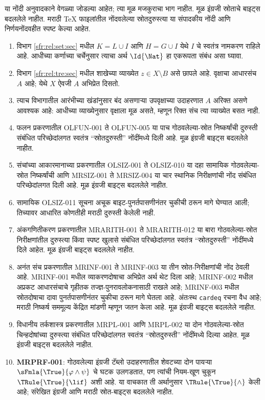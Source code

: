 या नोंदी अनुवादकाने वेगळ्या जोडल्या आहेत; त्या मूळ मजकुराचा भाग नाहीत.
मूळ इंग्रजी स्रोताचे बाइट्स बदललेले नाहीत. मराठी TeX फाइलांतील नोंदवलेल्या स्रोतदुरुस्त्या या संपादकीय नोंदी आणि निर्णयनोंदवहीत स्पष्ट केल्या आहेत.
\begin{enumerate}
\item विभाग \ref{sfr:rel:set:sec} मधील $K=L\cup I$ आणि $H=G\cup I$ येथे
$I$ चे स्वतंत्र नामकरण राहिले आहे. आधीच्या कर्णाच्या चर्चेनुसार त्याचा अर्थ
$\Id{\Nat}$ हा एकरूपता संबंध असा घ्यावा.
\item विभाग \ref{sfr:rel:tre:sec} मधील शाखेच्या व्याख्येत $z\in X\setminus B$
असे छापले आहे. वृक्षाचा आधारसंच $A$ आहे; येथे $X$ ऐवजी $A$ अभिप्रेत दिसतो.
\item त्याच विभागातील आरंभीच्या खंडांनुसार बंद असणाऱ्या उपवृक्षाच्या उदाहरणात
$A$ अरिक्त असणे आवश्यक आहे: आधीच्या व्याख्येनुसार वृक्षाला मूळ असते,
म्हणून रिक्त संच त्या व्याख्येत बसत नाही.
\item फलन प्रकरणातील OLFUN-001 ते OLFUN-005 या पाच
गोठवलेल्या-स्रोत निष्कर्षांची दुरुस्ती संबंधित परिच्छेदांलगत स्वतंत्र
``स्रोतदुरुस्ती'' नोंदींमध्ये दिली आहे. मूळ इंग्रजी बाइट्स बदललेले नाहीत.
\item संचांच्या आकारमानाच्या प्रकरणातील OLSIZ-001 ते OLSIZ-010
या दहा सामायिक गोठवलेल्या-स्रोत निष्कर्षांची आणि MRSIZ-001 ते MRSIZ-004
या चार स्थानिक निरीक्षणांची नोंद संबंधित परिच्छेदांलगत दिली आहे. मूळ
इंग्रजी बाइट्स बदललेले नाहीत.
\item सामायिक OLSIZ-011 सूचना अचूक बाइट-पुनर्तपासणीनंतर चुकीची ठरून
मागे घेण्यात आली; तिच्यावर आधारित कोणतीही मराठी दुरुस्ती केलेली नाही.
\item अंकगणितीकरण प्रकरणातील MRARITH-001 ते MRARITH-012 या बारा
गोठवलेल्या-स्रोत निरीक्षणांतील दुरुस्त्या किंवा स्पष्ट खुलासे संबंधित
परिच्छेदांलगत स्वतंत्र ``स्रोतदुरुस्ती'' नोंदींमध्ये दिले आहेत. मूळ
इंग्रजी बाइट्स बदललेले नाहीत.
\item अनंत संच प्रकरणातील MRINF-001 ते MRINF-003 या तीन स्रोत-निरीक्षणांची
नोंद ठेवली आहे. MRINF-001 मधील व्याकरणदोषाचा अभिप्रेत अर्थ थेट दिला आहे;
MRINF-002 मधील अप्रकट आधारसंचाचे गृहीतक तज्ज्ञ-पुनरावलोकनासाठी राखले आहे;
MRINF-003 मधील स्रोतदोषाचा दावा पुनर्तपासणीनंतर चुकीचा ठरून मागे घेतला आहे.
अंतःस्थ \texttt{cardeq} रचना वैध आहे; मराठी निष्कर्ष सममूल्य केंद्रित
मांडणी म्हणून जतन केला आहे. मूळ इंग्रजी बाइट्स बदललेले नाहीत.
\item विधानीय तर्कशास्त्र प्रकरणातील MRPL-001 आणि MRPL-002 या दोन
गोठवलेल्या-स्रोत चिन्हदोषांच्या दुरुस्त्या संबंधित परिच्छेदांलगत स्वतंत्र
``स्रोतदुरुस्ती'' नोंदींमध्ये दिल्या आहेत. मूळ इंग्रजी बाइट्स बदललेले नाहीत.
\item \textbf{MRPRF-001}: गोठवलेल्या इंग्रजी टॅब्लो उदाहरणातील
शेवटच्या दोन पायऱ्या $\sFmla{\True}{\varphi \land \psi}$ चे घटक उलगडतात,
पण त्यांची नियम-खूण चुकून $\TRule{\True}{\lif}$ अशी आहे. या वाचकात ती
अर्थानुसार $\TRule{\True}{\land}$ केली आहे; संरेखित इंग्रजी आणि मराठी
स्रोत-बाइट्स बदललेले नाहीत.


\end{enumerate}
